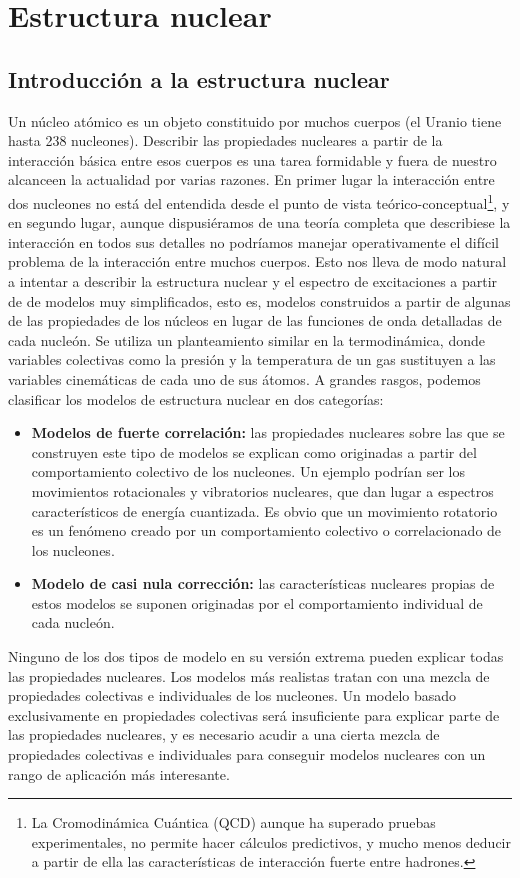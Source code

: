 \chapter{Estructura nuclear} \label{Ch:04}

\section{Introducción a la estructura nuclear}

Un núcleo atómico es un objeto constituido por muchos cuerpos (el Uranio tiene hasta 238 nucleones). Describir las propiedades nucleares a partir de la interacción básica entre esos cuerpos es una tarea formidable y fuera de nuestro alcanceen la actualidad por varias razones. En primer lugar la interacción entre dos nucleones no está del entendida desde el punto de vista teórico-conceptual\footnote{La Cromodinámica Cuántica (QCD) aunque ha superado pruebas experimentales, no permite hacer cálculos predictivos, y mucho menos deducir a partir de ella las características de interacción fuerte entre hadrones.}, y en segundo lugar, aunque dispusiéramos de una teoría completa que describiese la interacción en todos sus detalles no podríamos manejar operativamente el difícil problema de la interacción entre muchos cuerpos. Esto nos lleva de modo natural a intentar a describir la estructura nuclear y el espectro de excitaciones a partir de de modelos muy simplificados, esto es, modelos construidos a partir de algunas de las propiedades de los núcleos en lugar de las funciones de onda detalladas de cada nucleón. Se utiliza un planteamiento similar en la termodinámica, donde variables colectivas como la presión y la temperatura de un gas sustituyen a las variables cinemáticas de cada uno de sus átomos. A grandes rasgos, podemos clasificar los modelos de estructura nuclear en dos categorías:

\begin{itemize}
    \item \textbf{Modelos de fuerte correlación:} las propiedades nucleares sobre las que se construyen este tipo de modelos se explican como originadas a partir del comportamiento colectivo de los nucleones. Un ejemplo podrían ser los movimientos rotacionales y vibratorios nucleares, que dan lugar a espectros característicos de energía cuantizada. Es obvio que un movimiento rotatorio es un fenómeno creado por un comportamiento colectivo o correlacionado de los nucleones.
    \item \textbf{Modelo de casi nula corrección:} las características nucleares propias de estos modelos se suponen originadas por el comportamiento individual de cada nucleón.
\end{itemize}
Ninguno de los dos tipos de modelo en su versión extrema pueden explicar todas las propiedades nucleares. Los modelos más realistas tratan con una mezcla de propiedades colectivas e individuales de los nucleones. Un modelo basado exclusivamente en propiedades colectivas será insuficiente para explicar parte de las propiedades nucleares, y es necesario acudir a una cierta mezcla de propiedades colectivas e individuales para conseguir modelos nucleares con un rango de aplicación más interesante.

